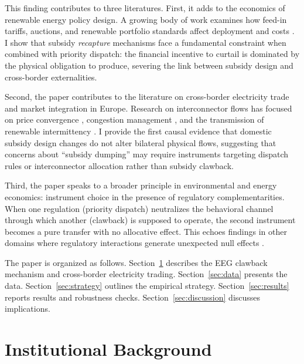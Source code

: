 \documentclass[12pt]{article}
\begin{document}
This finding contributes to three literatures. First, it adds to the economics of renewable energy policy design. A growing body of work examines how feed-in tariffs, auctions, and renewable portfolio standards affect deployment and costs \citep{newbery2018market, fabra2023technology, callaway2018location}. I show that subsidy \textit{recapture} mechanisms face a fundamental constraint when combined with priority dispatch: the financial incentive to curtail is dominated by the physical obligation to produce, severing the link between subsidy design and cross-border externalities.

Second, the paper contributes to the literature on cross-border electricity trade and market integration in Europe. Research on interconnector flows has focused on price convergence \citep{zachmann2008electricity}, congestion management \citep{newbery2016benefits}, and the transmission of renewable intermittency \citep{gianfreda2016wind}. I provide the first causal evidence that domestic subsidy design changes do not alter bilateral physical flows, suggesting that concerns about ``subsidy dumping'' may require instruments targeting dispatch rules or interconnector allocation rather than subsidy clawback.

Third, the paper speaks to a broader principle in environmental and energy economics: instrument choice in the presence of regulatory complementarities. When one regulation (priority dispatch) neutralizes the behavioral channel through which another (clawback) is supposed to operate, the second instrument becomes a pure transfer with no allocative effect. This echoes findings in other domains where regulatory interactions generate unexpected null effects \citep{fowlie2012market, borenstein2012private}.

The paper is organized as follows. Section~\ref{sec:background} describes the EEG clawback mechanism and cross-border electricity trading. Section~\ref{sec:data} presents the data. Section~\ref{sec:strategy} outlines the empirical strategy. Section~\ref{sec:results} reports results and robustness checks. Section~\ref{sec:discussion} discusses implications.

\section{Institutional Background}
\label{sec:background}
\end{document}
